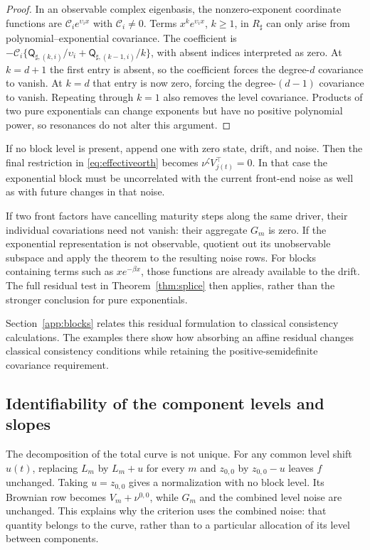 \begin{proof}
In an observable complex eigenbasis, the nonzero-exponent coordinate functions are $\mathcal C_i e^{\upsilon_i x}$ with $\mathcal C_i\ne0$. Terms $x^ke^{\upsilon_i x}$, $k\ge1$, in $R_\sharp$ can only arise from polynomial--exponential covariance. The coefficient is
$-\mathcal C_i\{\mathsf Q_{\sharp,(k,i)}/\upsilon_i+\mathsf Q_{\sharp,(k-1,i)}/k\}$, with absent indices interpreted as zero. At $k=d+1$ the first entry is absent, so the coefficient forces the degree-$d$ covariance to vanish. At $k=d$ that entry is now zero, forcing the degree-$(d-1)$ covariance to vanish. Repeating through $k=1$ also removes the level covariance. Products of two pure exponentials can change exponents but have no positive polynomial power, so resonances do not alter this argument.
\end{proof}

If no block level is present, append one with zero state, drift, and noise. Then the final restriction in \eqref{eq:effectiveorth} becomes $\nu^\zeta V_{j(t)}^\top=0$. In that case the exponential block must be uncorrelated with the current front-end noise as well as with future changes in that noise.

If two front factors have cancelling maturity steps along the same driver, their individual covariations need not vanish: their aggregate $G_m$ is zero. If the exponential representation is not observable, quotient out its unobservable subspace and apply the theorem to the resulting noise rows. For blocks containing terms such as $xe^{-\beta x}$, those functions are already available to the drift. The full residual test in Theorem~\ref{thm:splice} then applies, rather than the stronger conclusion for pure exponentials.

Section~\ref{app:blocks} relates this residual formulation to classical consistency calculations. The examples there show how absorbing an affine residual changes classical consistency conditions while retaining the positive-semidefinite covariance requirement.

\subsection{Identifiability of the component levels and slopes}\label{sec:normalization}
The decomposition of the total curve is not unique. For any common level shift $u(t)$, replacing $L_m$ by $L_m+u$ for every $m$ and $z_{0,0}$ by $z_{0,0}-u$ leaves $f$ unchanged. Taking $u=z_{0,0}$ gives a normalization with no block level. Its Brownian row becomes $V_m+\nu^{0,0}$, while $G_m$ and the combined level noise are unchanged. This explains why the criterion uses the combined noise: that quantity belongs to the curve, rather than to a particular allocation of its level between components.


